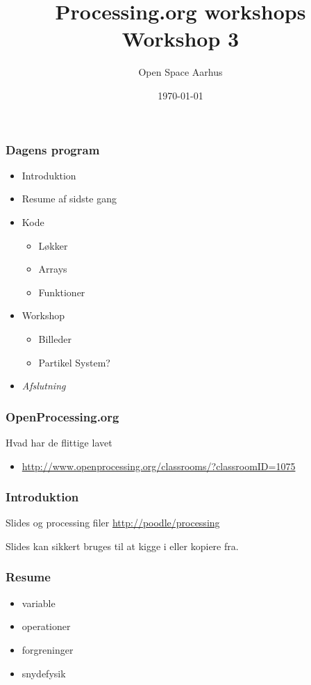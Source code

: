 \documentclass{beamer}
\title{Processing.org workshops\\Workshop 3}
\author{Open Space Aarhus}
\date{\today}
\institute[Bryggervej 30]{Bryggervej 30, 8240 Århus N}
\begin{document}
\begin{frame}[label=titlepage]
  \titlepage
\end{frame}

\begin{frame}
  \frametitle{Dagens program}
  \begin{itemize}
  \item Introduktion
  \item Resume af sidste gang
  \item Kode
    \begin{itemize}
    \item Løkker
    \item Arrays
    \item Funktioner
    \end{itemize}

  \item Workshop
    \begin{itemize}
    \item Billeder
    \item Partikel System?
    \end{itemize}

  \item \emph{Afslutning}
    
  \end{itemize}						
\end{frame}


\begin{frame}
  \frametitle{OpenProcessing.org}
  \begin{block}{Hvad har de flittige lavet}
    \begin{itemize}
    \item \url{http://www.openprocessing.org/classrooms/?classroomID=1075}
    \end{itemize}
  \end{block}
\end{frame}


\begin{frame}
  \frametitle{Introduktion}
  
  \begin{block}{Slides og processing filer}
    \url{http://poodle/processing}   
  \end{block}
  {\tiny Slides kan sikkert bruges til at kigge i eller kopiere fra.}
\end{frame}

\begin{frame}
  \frametitle{Resume}
  
  \begin{itemize}
  \item variable
  \item operationer
  \item forgreninger
  \item snydefysik
  \end{itemize}  
\end{frame}
\end{document}
